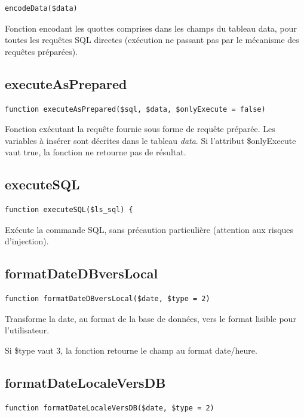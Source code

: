 \begin{lstlisting}
encodeData($data)
\end{lstlisting}

Fonction encodant les quottes comprises dans les champs du tableau data, pour toutes les requêtes SQL directes (exécution ne passant pas par le mécanisme des requêtes préparées).

\subsection{executeAsPrepared}

\begin{lstlisting}
function executeAsPrepared($sql, $data, $onlyExecute = false) 
\end{lstlisting}

Fonction exécutant la requête fournie sous forme de requête préparée. Les variables à insérer sont décrites dans le tableau \textit{data}. Si l'attribut \$onlyExecute vaut true, la fonction ne retourne pas de résultat.

\subsection{executeSQL}

\begin{lstlisting}
function executeSQL($ls_sql) {
\end{lstlisting}

Exécute la commande SQL, sans précaution particulière (attention aux risques d'injection).

\subsection{formatDateDBversLocal}

\begin{lstlisting}
function formatDateDBversLocal($date, $type = 2)
\end{lstlisting}

Transforme la date, au format de la base de données, vers le format lisible pour l'utilisateur.

Si \$type vaut 3, la fonction retourne le champ au format date/heure.

\subsection{formatDateLocaleVersDB}
\begin{lstlisting}
function formatDateLocaleVersDB($date, $type = 2)
\end{lstlisting}

